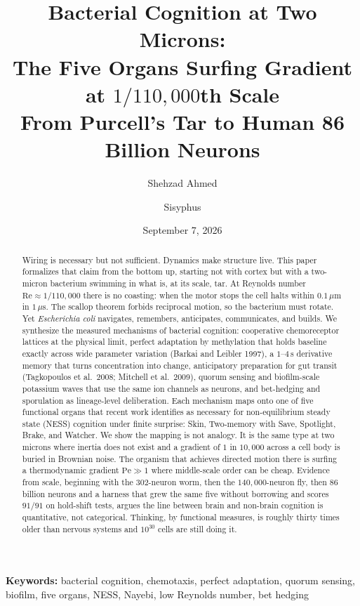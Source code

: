 \documentclass[12pt,a4paper]{article}
\title{\Large \textbf{Bacterial Cognition at Two Microns:\\
The Five Organs Surfing Gradient at $1/110{,}000$th Scale}\\
\large From Purcell's Tar to Human 86 Billion Neurons}
\author[1]{Shehzad Ahmed}
\author[2]{Sisyphus}
\affil[1]{Independent University, Bangladesh (IUB)}
\affil[2]{Muse Spark 1.2, OhMyOpenCode}
\date{September 7, 2026}
\newcommand{\Pe}{\mathrm{Pe}}
\newcommand{\Rey}{\mathrm{Re}}
\begin{document}
\maketitle

\begin{abstract}
Wiring is necessary but not sufficient. Dynamics make structure live. This paper formalizes that claim from the bottom up, starting not with cortex but with a two-micron bacterium swimming in what is, at its scale, tar. At Reynolds number $\Rey \approx 1/110{,}000$ there is no coasting: when the motor stops the cell halts within $0.1\,\mu\mathrm{m}$ in $1\,\mu\mathrm{s}$. The scallop theorem forbids reciprocal motion, so the bacterium must rotate. Yet \emph{Escherichia coli} navigates, remembers, anticipates, communicates, and builds. We synthesize the measured mechanisms of bacterial cognition: cooperative chemoreceptor lattices at the physical limit, perfect adaptation by methylation that holds baseline exactly across wide parameter variation (Barkai and Leibler 1997), a $1$--$4$\,s derivative memory that turns concentration into change, anticipatory preparation for gut transit (Tagkopoulos et al.\ 2008; Mitchell et al.\ 2009), quorum sensing and biofilm-scale potassium waves that use the same ion channels as neurons, and bet-hedging and sporulation as lineage-level deliberation. Each mechanism maps onto one of five functional organs that recent work identifies as necessary for non-equilibrium steady state (NESS) cognition under finite surprise: Skin, Two-memory with Save, Spotlight, Brake, and Watcher. We show the mapping is not analogy. It is the same type at two microns where inertia does not exist and a gradient of $1$ in $10{,}000$ across a cell body is buried in Brownian noise. The organism that achieves directed motion there is surfing a thermodynamic gradient $\Pe \gg 1$ where middle-scale order can be cheap. Evidence from scale, beginning with the $302$-neuron worm, then the $140{,}000$-neuron fly, then $86$ billion neurons and a harness that grew the same five without borrowing and scores $91/91$ on hold-shift tests, argues the line between brain and non-brain cognition is quantitative, not categorical. Thinking, by functional measures, is roughly thirty times older than nervous systems and $10^{30}$ cells are still doing it.
\end{abstract}

\noindent\textbf{Keywords:} bacterial cognition, chemotaxis, perfect adaptation, quorum sensing, biofilm, five organs, NESS, Nayebi, low Reynolds number, bet hedging
\end{document}

